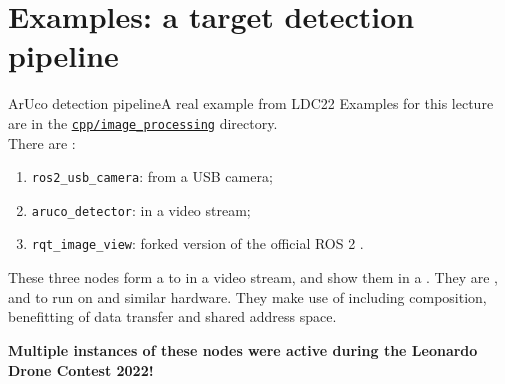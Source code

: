 
\section{Examples: a target detection pipeline}
\graphicspath{{figs/section4/}}

\begin{frame}{ArUco detection pipeline}{A real example from LDC22}
  \justifying
  Examples for this lecture are in the \href{https://github.com/IntelligentSystemsLabUTV/ros2-examples/tree/humble/src/cpp/image_processing}{\color{blue}\underline{\texttt{cpp/image\_processing}}} directory.\\
  \medskip
  There are :
  \begin{enumerate}
    \item \texttt{ros2\_usb\_camera}:  from a USB camera;
    \item \texttt{aruco\_detector}:  in a video stream;
    \item \texttt{rqt\_image\_view}: forked version of the official ROS 2 .
  \end{enumerate}
  These three nodes form a  to  in a video stream, and show them in a . They are , and  to run on  and similar hardware. They make use of  including composition, benefitting of  data transfer and shared address space.
  \medskip
  \begin{block}{}
    \centering
    \textbf{Multiple instances of these nodes were active during the Leonardo Drone Contest 2022!}
  \end{block}
\end{frame}
